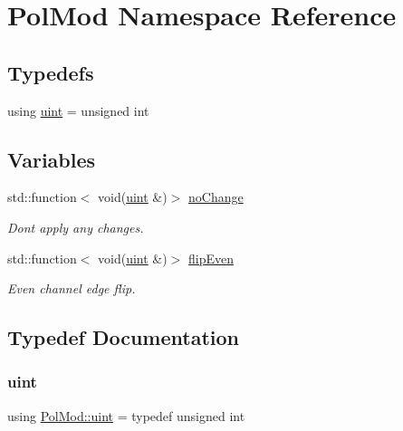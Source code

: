 \hypertarget{namespace_pol_mod}{}\section{Pol\+Mod Namespace Reference}
\label{namespace_pol_mod}
\subsection*{Typedefs}
\begin{DoxyCompactItemize}
\item 
using \hyperlink{namespace_pol_mod_a4d3b4a5eef6446c873dc0b5aa02c4f99}{uint} = unsigned int
\end{DoxyCompactItemize}
\subsection*{Variables}
\begin{DoxyCompactItemize}
\item 
std\+::function$<$ void(\hyperlink{namespace_pol_mod_a4d3b4a5eef6446c873dc0b5aa02c4f99}{uint} \&)$>$ \hyperlink{namespace_pol_mod_ab917c96757340e5d8901808f819ddf4c}{no\+Change}
\begin{DoxyCompactList}\small\item\em Don\textquotesingle{}t apply any changes. \end{DoxyCompactList}\item 
std\+::function$<$ void(\hyperlink{namespace_pol_mod_a4d3b4a5eef6446c873dc0b5aa02c4f99}{uint} \&)$>$ \hyperlink{namespace_pol_mod_a40220fc636b5ce60f937d5e3e001f630}{flip\+Even}
\begin{DoxyCompactList}\small\item\em Even channel edge flip. \end{DoxyCompactList}\end{DoxyCompactItemize}


\subsection{Typedef Documentation}
\mbox{\label{namespace_pol_mod_a4d3b4a5eef6446c873dc0b5aa02c4f99}} 
\subsubsection{\texorpdfstring{uint}{uint}}
{\footnotesize\ttfamily using \hyperlink{namespace_pol_mod_a4d3b4a5eef6446c873dc0b5aa02c4f99}{Pol\+Mod\+::uint} = typedef unsigned int}



